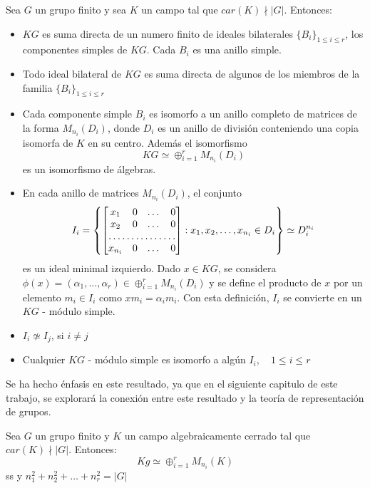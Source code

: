 \begin{teorema}
Sea $G$ un grupo finito y sea $K$ un campo tal que $car(K) \nmid |G|$. Entonces:
\begin{itemize}
\item $KG$ es suma directa de un numero finito de ideales bilaterales $\{B_i\}_{ 1 \leq i \leq r}$, los componentes simples de $KG$. Cada $B_i$ es una anillo simple.
\item Todo ideal bilateral de $KG$ es suma directa de algunos de los miembros de la familia $\{B_i\}_{ 1 \leq i \leq r}$
\item Cada componente simple $B_i$ es isomorfo a un anillo completo de matrices de la forma $M_{n_i}(D_i)$, donde $D_i$ es un anillo de división conteniendo una copia isomorfa de $K$ en su centro. Además el isomorfismo
\[KG \simeq \oplus_{i=1}^{r} M_{n_i}(D_i) \]
es un isomorfismo de álgebras. 
\item En cada anillo de matrices $M_{n_i}(D_i)$, el conjunto
\[ I_i =  \left\{ \begin{bmatrix}
x_1 & 0 & \dots & 0 \\
x_2 & 0 & \dots & 0 \\
\hdotsfor{4} \\
x_{n_i} & 0 & \dots & 0 \\
\end{bmatrix} : x_1, x_2, \dots, x_{n_i} \in D_i \right\} \simeq D_i^{n_i} \] 
es un ideal minimal izquierdo. 
Dado $x \in KG$, se considera $\phi (x) = (\alpha_1, \dots, \alpha_r) \in \oplus_{i=1}^r M_{n_i}(D_i)$ y se define el producto de $x$ por un elemento $m_i \in I_i$ como $xm_i = \alpha_im_i$. Con esta definición, $I_i$ se convierte en un $KG$ - módulo simple.

\item $I_i \not \simeq I_j$, si $ i \neq j$
\item Cualquier $KG$ - módulo simple es isomorfo a algún $I_i, \quad 1 \leq i \leq r$ 
\end{itemize}
\end{teorema}

Se ha hecho énfasis en este resultado, ya que en el siguiente capitulo de este trabajo, se explorará la conexión entre este resultado y la teoría de representación de grupos. 

\begin{corolario}
Sea $G$ un grupo finito y $K$ un campo algebraicamente cerrado tal que $car(K) \nmid |G| $. Entonces:
\[Kg \simeq \oplus_{i=1}^{r} M_{n_i}(K)\]ss
y $n_1^2 + n_2^2 + \dots + n_r^2 = |G| $
\end{corolario}

